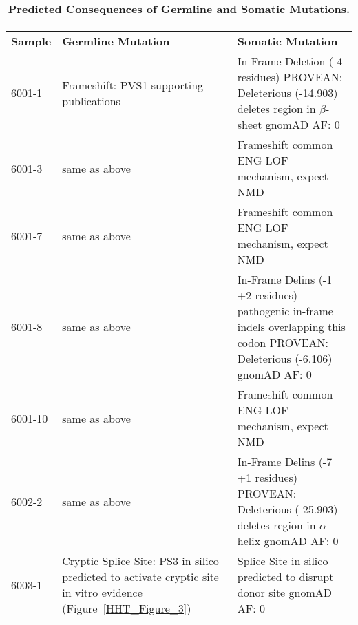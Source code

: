 \begin{table}[]
\footnotesize
\renewcommand{\arraystretch}{1.7} 
\centering
\caption[Predicted Consequences of Germline and Somatic Mutations]{\textbf{Predicted Consequences of Germline and Somatic Mutations.}}

\begin{tabularx}{\textwidth}{l p{4.4cm} X}
\multicolumn{3}{l}{} \\
\toprule
\textbf{Sample} & \textbf{Germline Mutation} & \textbf{Somatic Mutation} \\
\midrule
6001-1 & Frameshift: PVS1 \newline 6 supporting publications &In-Frame Deletion (-4 residues) \newline PROVEAN: Deleterious (-14.903) \newline deletes region in $\beta$-sheet \newline gnomAD AF: 0 \\\hline
6001-3 & same as above & Frameshift \newline common ENG LOF mechanism, expect NMD \\\hline
6001-7 & same as above & Frameshift \newline common ENG LOF mechanism, expect NMD \\\hline
6001-8 & same as above & In-Frame Delins (-1 +2 residues) \newline 2 pathogenic in-frame indels overlapping this codon \citep{shovlin1997, argyriou2006} \newline PROVEAN: Deleterious (-6.106) \newline gnomAD AF: 0 \\\hline
6001-10 & same as above & Frameshift \newline common ENG LOF mechanism, expect NMD \\\hline
6002-2 & same as above & In-Frame Delins (-7 +1 residues) \newline PROVEAN: Deleterious (-25.903) \newline deletes region in $\alpha$-helix \newline gnomAD AF: 0 \\\hline
6003-1 & Cryptic Splice Site: PS3 \newline in silico predicted to activate cryptic site \newline in vitro evidence (Figure~\ref{HHT_Figure_3}) & Splice Site \newline in silico predicted to disrupt donor site \newline gnomAD AF: 0 \\\hline

\end{tabularx}
\end{table}
